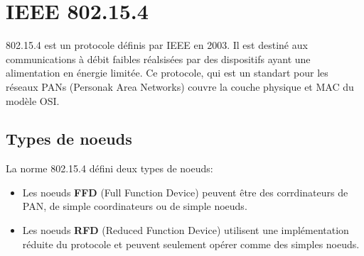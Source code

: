 \section{IEEE 802.15.4}\label{sec:etat_art-802.15.4}
\renewcommand{\rightmark}{IEEE 802.15.4}

  802.15.4 est un protocole définis par IEEE en 2003. Il est destiné aux
  communications à débit faibles réalsisées par des dispositifs ayant une
  alimentation en énergie limitée.
  Ce protocole, qui est un standart pour les réseaux PANs (Personak Area
  Networks) couvre la couche physique et MAC du modèle OSI.

\subsection{Types de noeuds}\label{subsec:etat_art-802.15.4.nodes}
  La norme 802.15.4 défini deux types de noeuds:
  \begin{itemize}
    \item Les noeuds \textbf{FFD} (Full Function Device) peuvent être des corrdinateurs de PAN, de simple
          coordinateurs ou de simple noeuds.
    \item Les noeuds \textbf{RFD} (Reduced Function Device) utilisent une implémentation réduite du protocole
    et peuvent seulement opérer comme des simples noeuds.  
  \end{itemize}

